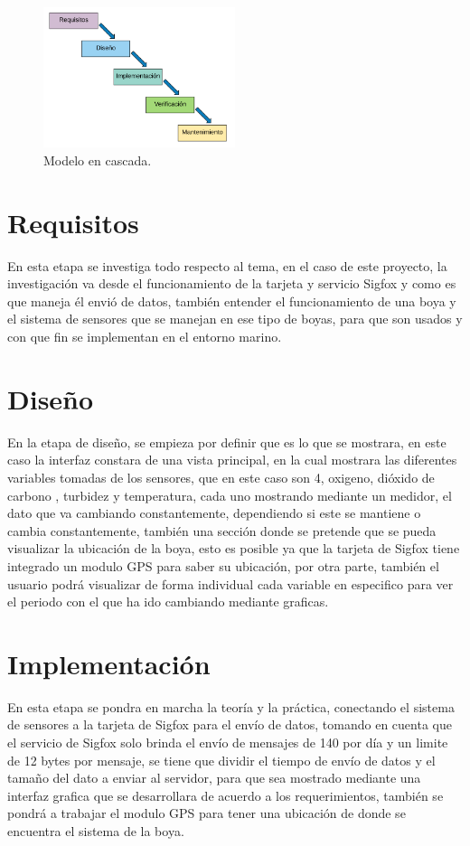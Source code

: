 \documentclass[12pt]{book}
\begin{document}
\begin{figure}[h]
	\centering
	\includegraphics[width=0.5\textwidth]{imagenes/cascada}
	\caption[Modelo en cascada]{Modelo en cascada.}
	\label{fig:cascada}
\end{figure}

\section{Requisitos}
En esta etapa se investiga todo respecto al tema, en el caso de este proyecto, la investigación va desde el funcionamiento de la tarjeta y servicio Sigfox y como es que maneja él envió de datos, también entender el funcionamiento de una boya y el sistema de sensores que se manejan en ese tipo de boyas, para que son usados y con que fin se implementan en el entorno marino.

\section{Diseño}
En la etapa de diseño, se empieza por definir que es lo que se mostrara, en este caso la interfaz constara de una vista principal, en la cual mostrara las diferentes variables tomadas de los sensores, que en este caso son 4, oxigeno, dióxido de carbono , turbidez y temperatura, cada uno mostrando mediante un medidor, el dato que va cambiando constantemente, dependiendo si este se mantiene o cambia constantemente, también una sección donde se pretende que se pueda visualizar la ubicación de la boya, esto es posible ya que la tarjeta de Sigfox tiene integrado un modulo GPS para saber su ubicación, por otra parte, también el usuario podrá visualizar de forma individual cada variable en especifico para ver el periodo con el que ha ido cambiando mediante graficas. 

\section{Implementación}
 En esta etapa se pondra en marcha la teoría y la práctica, conectando el sistema de sensores a la tarjeta de Sigfox para el envío de datos, tomando en cuenta que el servicio de Sigfox solo brinda el envío de mensajes de 140 por día y un limite de 12 bytes por mensaje, se tiene que dividir el tiempo de envío de datos y el tamaño del dato a enviar al servidor, para que sea mostrado mediante una interfaz grafica que se desarrollara de acuerdo a los requerimientos, también se pondrá a trabajar el modulo GPS para tener una ubicación de donde se encuentra el sistema de la boya.
 
\end{document}
